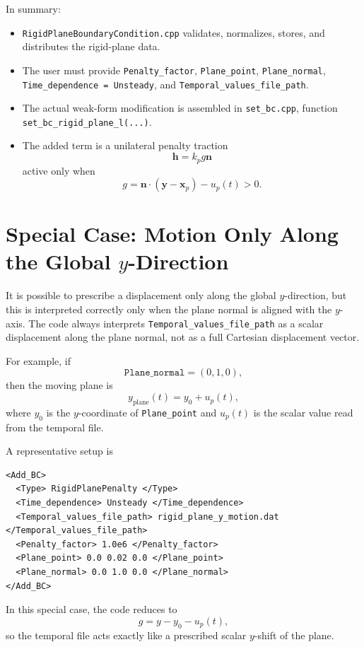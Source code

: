 \documentclass[11pt]{article}
\begin{document}
In summary:

\begin{itemize}[leftmargin=*]
\item \texttt{RigidPlaneBoundaryCondition.cpp} validates, normalizes, stores,
and distributes the rigid-plane data.
\item The user must provide \texttt{Penalty\_factor}, \texttt{Plane\_point},
\texttt{Plane\_normal}, \texttt{Time\_dependence = Unsteady}, and
\texttt{Temporal\_values\_file\_path}.
\item The actual weak-form modification is assembled in \texttt{set\_bc.cpp},
function \texttt{set\_bc\_rigid\_plane\_l(...)}.
\item The added term is a unilateral penalty traction
\[
\mathbf{h}=k_p g \mathbf{n}
\]
active only when
\[
g=\mathbf{n}\cdot(\mathbf{y}-\mathbf{x}_p)-u_p(t) > 0.
\]
\end{itemize}

\section{Special Case: Motion Only Along the Global \texorpdfstring{$y$}{y}-Direction}

It is possible to prescribe a displacement only along the global \(y\)-direction,
but this is interpreted correctly only when the plane normal is aligned with the
\(y\)-axis. The code always interprets \texttt{Temporal\_values\_file\_path} as a
scalar displacement along the plane normal, not as a full Cartesian displacement
vector.

For example, if
\[
\texttt{Plane\_normal} = (0,1,0),
\]
then the moving plane is
\[
y_{\text{plane}}(t) = y_0 + u_p(t),
\]
where \(y_0\) is the \(y\)-coordinate of \texttt{Plane\_point} and \(u_p(t)\) is
the scalar value read from the temporal file.

A representative setup is

\begin{verbatim}
<Add_BC>
  <Type> RigidPlanePenalty </Type>
  <Time_dependence> Unsteady </Time_dependence>
  <Temporal_values_file_path> rigid_plane_y_motion.dat </Temporal_values_file_path>
  <Penalty_factor> 1.0e6 </Penalty_factor>
  <Plane_point> 0.0 0.02 0.0 </Plane_point>
  <Plane_normal> 0.0 1.0 0.0 </Plane_normal>
</Add_BC>
\end{verbatim}

In this special case, the code reduces to
\[
g = y - y_0 - u_p(t),
\]
so the temporal file acts exactly like a prescribed scalar \(y\)-shift of the
plane.
\end{document}
